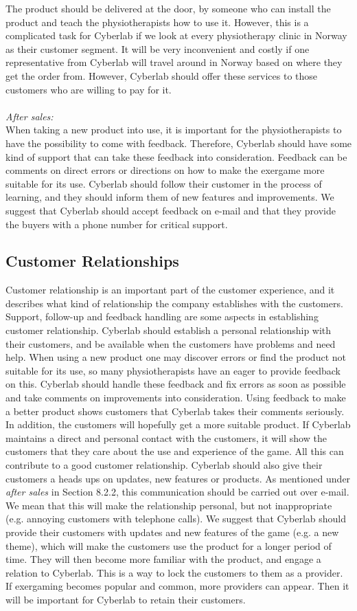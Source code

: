 The product should be delivered at the door, by someone who can install the product and teach the physiotherapists how to use it. However, this is a complicated task for Cyberlab if we look at every physiotherapy clinic in Norway as their customer segment. It will be very inconvenient and costly if one representative from Cyberlab will travel around in Norway based on where they get the order from. However, Cyberlab should offer these services to those customers who are willing to pay for it.  \\ \\
\emph{After sales:}\\
When taking a new product into use, it is important for the physiotherapists to have the possibility to come with feedback. Therefore, Cyberlab should have some kind of support that can take these feedback into consideration. Feedback can be comments on direct errors or directions on how to make the exergame more suitable for its use. Cyberlab should follow their customer in the process of learning, and they should inform them of new features and improvements. We suggest that Cyberlab should accept feedback on e-mail and that they provide the buyers with a phone number for critical support.  
\subsection{Customer Relationships}
Customer relationship is an important part of the customer experience, and it describes what kind of relationship the company establishes with the customers. Support, follow-up and feedback handling are some aspects in establishing customer relationship. Cyberlab should establish a personal relationship with their customers, and be available when the customers have problems and need help. When using a new product one may discover errors or find the product not suitable for its use, so many physiotherapists have an eager to provide feedback on this. Cyberlab should handle these feedback and fix errors as soon as possible and take comments on improvements into consideration. Using feedback to make a better product shows customers that Cyberlab takes their comments seriously.  In addition, the customers will hopefully get a more suitable product.  If Cyberlab maintains a direct and personal contact with the customers, it will show the customers that they care about the use and experience of the game.  All this can contribute to a good customer relationship. Cyberlab should also give their customers a heads ups on updates, new features or products. As mentioned under \emph{after sales} in Section 8.2.2, this communication should be carried out over e-mail. We mean that this will make the relationship personal, but not inappropriate (e.g. annoying customers with telephone calls). We suggest that Cyberlab should provide their customers with updates and new features of the game (e.g. a new theme), which will make the customers use the product for a longer period of time. They will then become more familiar with the product, and engage a relation to Cyberlab. This is a way to lock the customers to them as a provider. If exergaming becomes popular and common, more providers can appear. Then it will be important for Cyberlab to retain their customers. 

